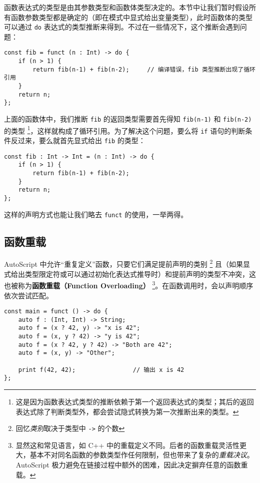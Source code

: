 函数表达式的类型是由其参数类型和函数体类型决定的。本节中让我们暂时假设所有函数参数类型都是确定的（即在模式中显式给出变量类型），此时函数体的类型可以通过 \lstinline!do! 表达式的类型推断来得到。不过在一些情况下，这个推断会遇到问题：

\begin{lstlisting}
const fib = funct (n : Int) -> do {
    if (n > 1) {
        return fib(n-1) + fib(n-2);     // 编译错误，fib 类型推断出现了循环引用
    }
    return n;
};
\end{lstlisting}

上面的函数体中，我们推断 \lstinline!fib! 的返回类型需要首先得知 \lstinline!fib(n-1)! 和 \lstinline!fib(n-2)! 的类型 \footnote{这是因为函数表达式类型的推断依赖于第一个返回表达式的类型；其后的返回表达式除了判断类型外，都会尝试隐式转换为第一次推断出来的类型。}，这样就构成了循环引用。为了解决这个问题，要么将 \lstinline!if! 语句的判断条件反过来，要么就首先显式给出 \lstinline!fib! 的类型：

\begin{lstlisting}
const fib : Int -> Int = (n : Int) -> do {
    if (n > 1) {
        return fib(n-1) + fib(n-2);
    }
    return n;
};
\end{lstlisting}

这样的声明方式也能让我们略去 \lstinline!funct! 的使用，一举两得。

\subsection{函数重载}

AutoScript 中允许“重复定义”函数，只要它们满足提前声明的类别 \footnote{回忆\emph{类别}取决于类型中 \lstinline!->! 的个数} 且（如果显式给出类型限定符或可以通过初始化表达式推导时）和提前声明的类型不冲突，这也被称为\textbf{函数重载（Function Overloading）} \footnote{显然这和常见语言，如 C++ 中的重载定义不同。后者的函数重载灵活性更大，基本不对同名函数的参数类型作任何限制，但也带来了复杂的\emph{重载决议}。AutoScript 极力避免在链接过程中额外的困难，因此决定摒弃任意的函数重载。}。在函数调用时，会以声明顺序依次尝试匹配。

\begin{lstlisting}
const main = funct () -> do {
    auto f : (Int, Int) -> String;
    auto f = (x ? 42, y) -> "x is 42";
    auto f = (x, y ? 42) -> "y is 42";
    auto f = (x ? 42, y ? 42) -> "Both are 42";
    auto f = (x, y) -> "Other";

    print f(42, 42);                // 输出 x is 42
};
\end{lstlisting}

